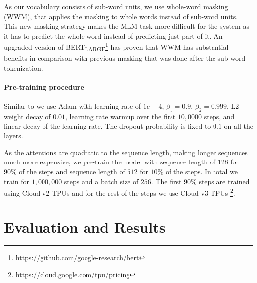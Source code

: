 \documentclass[10pt, a4paper]{article}
\begin{document}
As our vocabulary consists of sub-word units, we use whole-word masking (WWM), that applies the masking to whole words instead of sub-word units. This new masking strategy makes the MLM task more difficult for the system as it has to predict the whole word instead of predicting just part of it. An upgraded version of BERT\textsubscript{LARGE}\footnote{\scriptsize{\url{https://github.com/google-research/bert}}} has proven that WWM has substantial benefits in comparison with previous masking that was done after the sub-word tokenization.

\paragraph{Pre-training procedure}

Similar to \cite{devlin2019bert} we use Adam with learning rate of $1e-4$, $\beta_1=0.9$, $\beta_2=0.999$, L2 weight decay of $0.01$, learning rate warmup over the first $10,0000$ steps, and linear decay of the learning rate. The dropout probability is fixed to $0.1$ on all the layers.

As the attentions are quadratic to the sequence length, making longer sequences much more expensive, we pre-train the model with sequence length of $128$ for $90\%$ of the steps and sequence length of $512$ for $10\%$ of the steps. In total we train for $1,000,000$ steps and a batch size of $256$. The first $90\%$ steps are trained using Cloud v2 TPUs and for the rest of the steps we use Cloud v3 TPUs \footnote{\scriptsize{\url{https://cloud.google.com/tpu/pricing}}}.


\section{Evaluation and Results}\label{sec:eval-results}


\end{document}
